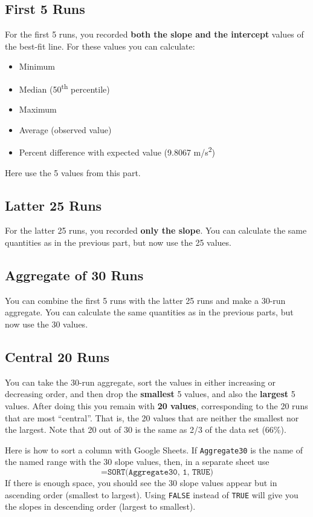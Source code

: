 \subsection{First 5 Runs} \label{sec:01.first.5}
%
For the first 5 runs, you recorded \textbf{both the slope and the intercept} values of the best-fit line. For these values you can calculate:
\begin{itemize}
    \item Minimum
    \item Median (50\textsuperscript{th} percentile)
    \item Maximum
    \item Average (observed value)
    \item Percent difference with expected value (9.8067 m/s\textsuperscript{2})
\end{itemize}
Here use the 5 values from this part.
%
\subsection{Latter 25 Runs} \label{sec:01.latter.25}
%
For the latter 25 runs, you recorded \textbf{only the slope}. You can calculate the same quantities as in the previous part, but now use the 25 values.
%
\subsection{Aggregate of 30 Runs} \label{sec:01.all.30}
%
You can combine the first 5 runs with the latter 25 runs and make a 30-run aggregate. You can calculate the same quantities as in the previous parts, but now use the 30 values.
%
\subsection{Central 20 Runs} \label{sec:01.central.20}
%
You can take the 30-run aggregate, sort the values in either increasing or decreasing order, and then drop the \textbf{smallest} 5 values, and also the \textbf{largest} 5 values. After doing this you remain with \textbf{20 values}, corresponding to the 20 runs that are most ``central''. That is, the 20 values that are neither the smallest nor the largest. Note that 20 out of 30 is the same as 2/3 of the data set (66\%).

Here is how to sort a column with Google Sheets. If \texttt{Aggregate30} is the name of the named range with the 30 slope values, then, in a separate sheet use
\begin{equation}
    \texttt{=SORT(Aggregate30, 1, TRUE)}
\end{equation}
If there is enough space, you should see the 30 slope values appear but in ascending order (smallest to largest). Using \texttt{FALSE} instead of \texttt{TRUE} will give you the slopes in descending order (largest to smallest).
%
